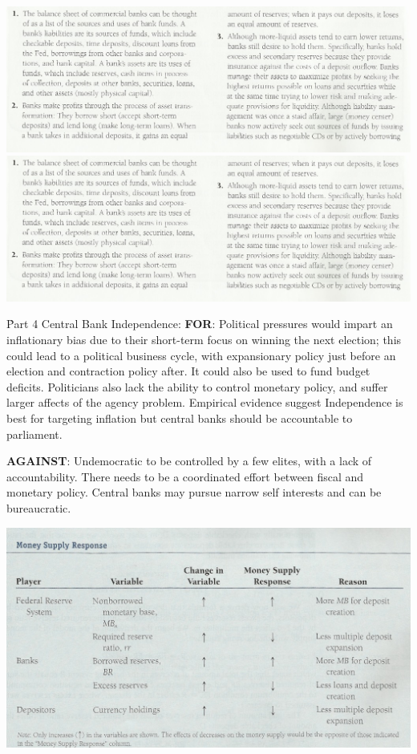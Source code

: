 \documentclass[12pt]{examnotes}
\begin{document}
\begin{center}
  \includegraphics[scale=0.45]{./imgs/c11sum1.jpg}
  \includegraphics[scale=0.45]{./imgs/c11sum1.jpg}
\end{center}


\h{Part 4}
Central Bank Independence:
\textbf{FOR}: Political pressures would impart an inflationary bias due to their short-term focus on winning the next election; this could lead to a political business cycle, with expansionary policy just before an election and contraction policy after. It could also be used to fund budget deficits. Politicians also lack the ability to control monetary policy, and suffer larger affects of the agency problem. Empirical evidence suggest Independence is best for targeting inflation but central banks should be accountable to parliament.

\textbf{AGAINST}: 
Undemocratic to be controlled by a few elites, with a lack of accountability. There needs to be a coordinated effort between fiscal and monetary policy. Central banks may pursue narrow self interests and can be bureaucratic. 

\begin{center}
  \includegraphics[scale=0.5]{./imgs/moneysupplytable.jpg}
\end{center}
\end{document}
